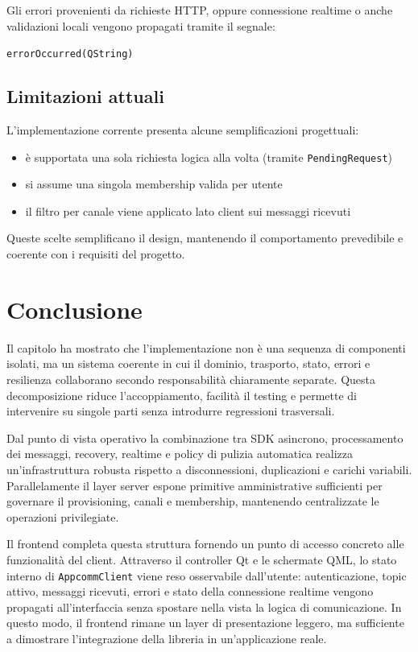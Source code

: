 \documentclass[a4paper, 11pt, twoside]{report}
\begin{document}
Gli errori provenienti da richieste HTTP, oppure connessione realtime o anche validazioni locali vengono propagati tramite 
il segnale:
\begin{center}
\texttt{errorOccurred(QString)}
\end{center}

\subsection{Limitazioni attuali}

L’implementazione corrente presenta alcune semplificazioni progettuali:

\begin{itemize}
    \item è supportata una sola richiesta logica alla volta (tramite \texttt{PendingRequest})
    \item si assume una singola membership valida per utente
    \item il filtro per canale viene applicato lato client sui messaggi ricevuti
\end{itemize}

Queste scelte semplificano il design, mantenendo il comportamento prevedibile e coerente con i requisiti del progetto.

\section{Conclusione}

Il capitolo ha mostrato che l'implementazione non è una sequenza di componenti isolati, ma un sistema coerente in cui il
dominio, trasporto, stato, errori e resilienza collaborano secondo responsabilità chiaramente separate. Questa decomposizione
riduce l'accoppiamento, facilità il testing e permette di intervenire su singole parti senza introdurre regressioni trasversali.

Dal punto di vista operativo la combinazione tra \gls{SDK} asincrono, processamento dei messaggi, recovery, realtime e policy di
pulizia automatica realizza un'infrastruttura robusta rispetto a disconnessioni, duplicazioni e carichi variabili.
Parallelamente il layer server espone primitive amministrative sufficienti per governare il provisioning, canali e membership,
mantenendo centralizzate le operazioni privilegiate.

Il frontend completa questa struttura fornendo un punto di accesso concreto alle funzionalità del client. Attraverso il controller Qt e le schermate QML, lo stato interno di \texttt{AppcommClient} viene reso osservabile dall'utente: autenticazione, topic attivo, messaggi ricevuti, errori e stato della connessione realtime vengono propagati all'interfaccia senza spostare nella vista la logica di comunicazione. In questo modo, il frontend rimane un layer di presentazione leggero, ma sufficiente a dimostrare l'integrazione della libreria in un'applicazione reale.
\end{document}

